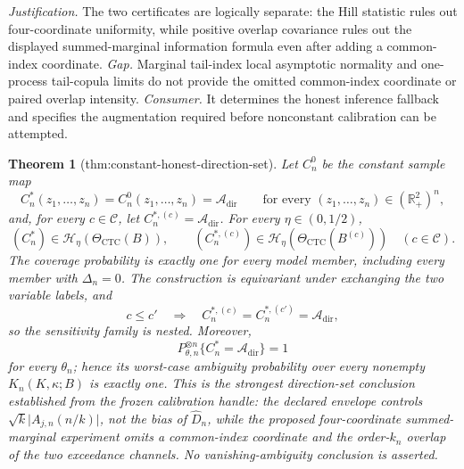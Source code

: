 \documentclass{article}
\newtheorem{theorem}{Theorem}
\begin{document}
\par\smallskip\noindent \textit{Justification.} The two certificates are logically separate: the Hill statistic rules out four-coordinate uniformity, while positive overlap covariance rules out the displayed summed-marginal information formula even after adding a common-index coordinate. \textit{Gap.} Marginal tail-index local asymptotic normality and one-process tail-copula limits do not provide the omitted common-index coordinate or paired overlap intensity. \textit{Consumer.} It determines the honest inference fallback and specifies the augmentation required before nonconstant calibration can be attempted.

\begin{theorem}[thm:constant-honest-direction-set]\label{thm:constant-honest-direction-set}
Let \(C_n^0\) be the constant sample map
\[
 C_n^*(z_1,\ldots,z_n)=C_n^0(z_1,\ldots,z_n)=\mathcal A_{\mathrm{dir}}
 \qquad\text{for every }(z_1,\ldots,z_n)\in(\mathbb R_+^2)^n,
\]
and, for every \(c\in\mathcal C\), let \(C_n^{*,(c)}=\mathcal A_{\mathrm{dir}}\).  For every \(\eta\in(0,1/2)\),
\[
 (C_n^*)\in\mathcal H_\eta(\Theta_{\mathrm{CTC}}(B)),
 \qquad
 (C_n^{*,(c)})\in\mathcal H_\eta(\Theta_{\mathrm{CTC}}(B^{(c)}))
 \quad(c\in\mathcal C).
\]
The coverage probability is exactly one for every model member, including every member with \(\Delta_n=0\).  The construction is equivariant under exchanging the two variable labels, and
\[
 c\leq c'\quad\Longrightarrow\quad
 C_n^{*,(c)}=C_n^{*,(c')}=\mathcal A_{\mathrm{dir}},
\]
so the sensitivity family is nested.  Moreover,
\[
 P_{\theta,n}^{\otimes n}\{C_n^*=\mathcal A_{\mathrm{dir}}\}=1
\]
for every \(\theta_n\); hence its worst-case ambiguity probability over every nonempty \(K_n(K,\kappa;B)\) is exactly one.  This is the strongest direction-set conclusion established from the frozen calibration handle: the declared envelope controls \(\sqrt{k}\lvert A_{j,n}(n/k)\rvert\), not the bias of \(\widehat D_n\), while the proposed four-coordinate summed-marginal experiment omits a common-index coordinate and the order-\(k_n\) overlap of the two exceedance channels.  No vanishing-ambiguity conclusion is asserted.
\end{theorem}
\end{document}
